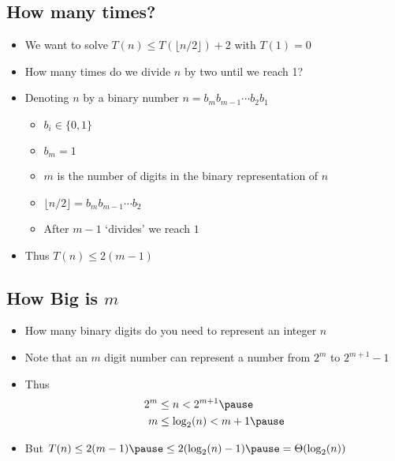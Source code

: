 \begin{slide}
\section[-1]{How many times?}

\begin{PauseHighLight}
  \begin{itemize}
  \item We want to solve $T(n)\leq T(\lfloor n/2 \rfloor) + 2$ with
    $T(1)=0$\pause
  \item How many times do we divide $n$ by two until we reach 1?\pause
  \item Denoting $n$ by a binary number $n=b_m b_{m-1} \cdots b_2 b_1$
    \begin{itemize}\squeeze
    \item $b_i\in\{0,1\}$\pause
    \item $b_m=1$ \pause
    \item $m$ is the number of digits in the binary representation of
    $n$\pause
    \item $\lfloor n/2 \rfloor=b_m b_{m-1} \cdots b_2$\pause
    \item After $m-1$ `divides' we reach $1$\pause
    \end{itemize}  
  \item Thus $T(n) \leq 2 (m-1)$\pause
  \end{itemize}
\end{PauseHighLight}
\end{slide}


\begin{slide}
\section{How Big is $m$}

\begin{PauseHighLight}
  \begin{itemize}
  \item How many binary digits do you need to represent an integer $n$\pause
  \item Note that an $m$ digit number can represent a number from $2^m$ to
    $2^{m+1}-1$\pause
  \item Thus
    \begin{align*}
      2^m &\leq n < 2^{m+1} \pause\\
      m &\leq \log_2(n) < m+1\pause
    \end{align*}
  \item But $T(n) \leq 2 (m-1)\pause \leq 2 (\log_2(n)-1)\pause = \Theta(\log_2(n))$\pause
  \end{itemize}
\end{PauseHighLight}
\end{slide}

